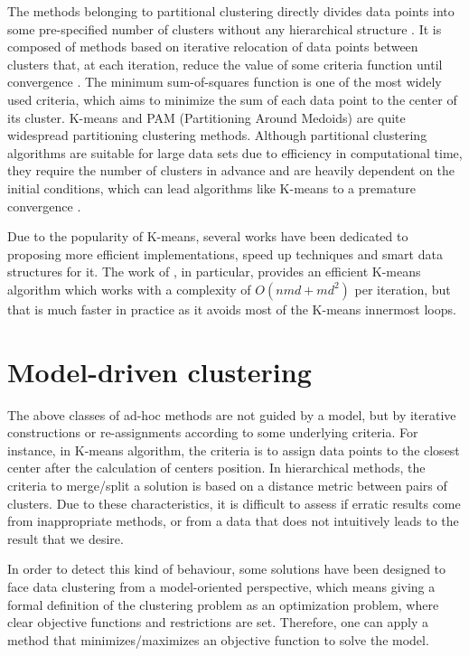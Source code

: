 The methods belonging to partitional clustering directly divides data points into some pre-specified number of clusters without any hierarchical structure \cite{Xu2005}. It is composed of methods based on iterative relocation of data points between clusters that, at each iteration, reduce the value of some criteria function until convergence \cite{Karkkainen2006}. The minimum sum-of-squares function is one of the most widely used criteria, which aims to minimize the sum of each data point to the center of its cluster. K-means and PAM (Partitioning Around Medoids) are quite widespread partitioning clustering methods. Although partitional clustering algorithms are suitable for large data sets due to efficiency in computational time, they require the number of clusters in advance and are heavily dependent on the initial conditions, which can lead algorithms like K-means to a premature convergence \cite{Das2009}.

Due to the popularity of K-means, several works have been dedicated to proposing more efficient implementations, speed up techniques and smart data structures for it. The work of \cite{Hamerly2010}, in particular, provides an efficient K-means algorithm which works with a complexity of $O(nmd + md^2)$ per iteration, but that is much faster in practice as it avoids most of the K-means innermost loops.

\section{Model-driven clustering}
The above classes of ad-hoc methods are not guided by a model, but by iterative constructions or re-assignments according to some underlying criteria. For instance, in K-means algorithm, the criteria is to assign data points to the closest center after the calculation of centers position. In hierarchical methods, the criteria to merge/split a solution is based on a distance metric between pairs of clusters. Due to these characteristics, it is difficult to assess if erratic results come from inappropriate methods, or from a data that does not intuitively leads to the result that we desire.

In order to detect this kind of behaviour, some solutions have been designed to face data clustering from a model-oriented perspective, which means giving a formal definition of the clustering problem as an optimization problem, where clear objective functions and restrictions are set. Therefore, one can apply a method that minimizes/maximizes an objective function to solve the model.

